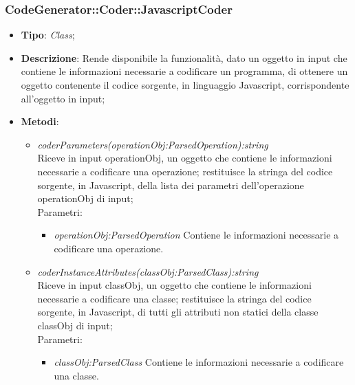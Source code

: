 \documentclass[../DefinizioneDiProdotto.tex]{subfiles}
\begin{document}
			\subsubsection{CodeGenerator::Coder::JavascriptCoder}
			\hypertarget{SWEDesigner::Server::CodeGenerator::Coder::JavascriptCoder}{}
			\begin{itemize}
				\item \textbf{Tipo}: \emph{Class};
				\item \textbf{Descrizione}: Rende disponibile la funzionalità, dato un oggetto in input che contiene le informazioni necessarie a codificare un programma, di ottenere un oggetto contenente il codice sorgente, in linguaggio Javascript, corrispondente all'oggetto in input;\\
				\item \textbf{Metodi}:
				\begin{itemize}
					\item \emph{coderParameters(operationObj:ParsedOperation):string} \\ 
					Riceve in input operationObj, un oggetto che contiene le informazioni necessarie a codificare una operazione; 
					restituisce la stringa del codice sorgente, in Javascript, della lista dei parametri dell'operazione operationObj di input; \\
					Parametri:
					\begin{itemize}
						\item \emph{operationObj:ParsedOperation} Contiene le informazioni necessarie a codificare una operazione.
					\end{itemize}
					
					\item \emph{coderInstanceAttributes(classObj:ParsedClass):string} \\ 
					Riceve in input classObj, un oggetto che contiene le informazioni necessarie a codificare una classe; 
					restituisce la stringa del codice sorgente, in Javascript, di tutti gli attributi non statici della classe classObj di input; \\
					Parametri:
					\begin{itemize}
						\item \emph{classObj:ParsedClass} Contiene le informazioni necessarie a codificare una classe.
					\end{itemize}
					

\end{itemize}
\end{itemize}
\end{document}
